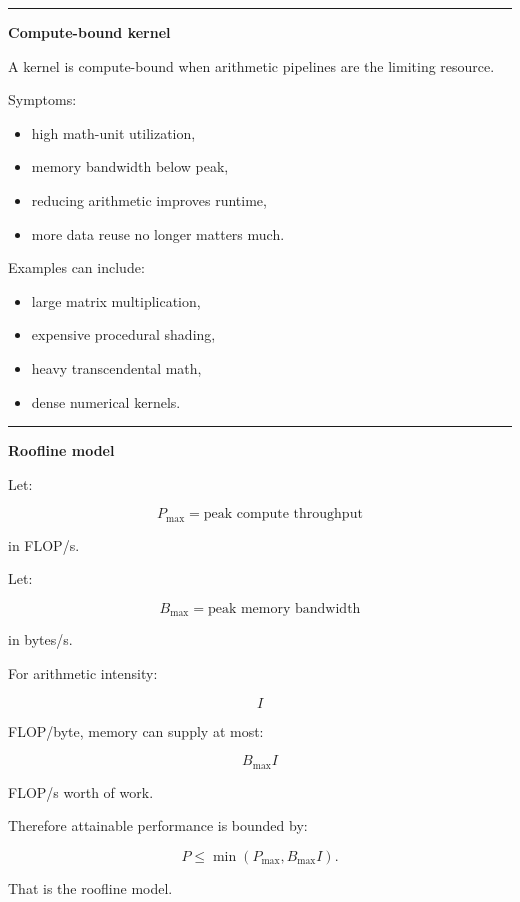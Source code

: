 \begin{center}\rule{0.5\linewidth}{0.5pt}\end{center}

\textbf{Compute-bound kernel}

A kernel is compute-bound when arithmetic pipelines are the limiting resource.

Symptoms:

\begin{itemize}
\tightlist
\item
  high math-unit utilization,
\item
  memory bandwidth below peak,
\item
  reducing arithmetic improves runtime,
\item
  more data reuse no longer matters much.
\end{itemize}

Examples can include:

\begin{itemize}
\tightlist
\item
  large matrix multiplication,
\item
  expensive procedural shading,
\item
  heavy transcendental math,
\item
  dense numerical kernels.
\end{itemize}

\begin{center}\rule{0.5\linewidth}{0.5pt}\end{center}

\textbf{Roofline model}

Let:

\[
P_{\max}
=
\text{peak compute throughput}
\]

in FLOP/s.

Let:

\[
B_{\max}
=
\text{peak memory bandwidth}
\]

in bytes/s.

For arithmetic intensity:

\[
I
\]

FLOP/byte, memory can supply at most:

\[
B_{\max}I
\]

FLOP/s worth of work.

Therefore attainable performance is bounded by:

\[
\boxed{
P
\le
\min(
P_{\max},
B_{\max}I
).
}
\]

That is the roofline model.

